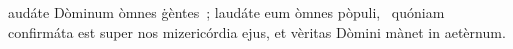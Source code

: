 { }
{%
audáte Dòminum òmnes ġèntes~; laudáte eum òmnes pòpuli, 
~quóniam confirmáta est super nos mizericórdia ejus, et vèritas Dòmini mànet in aetèrnum. 
}
